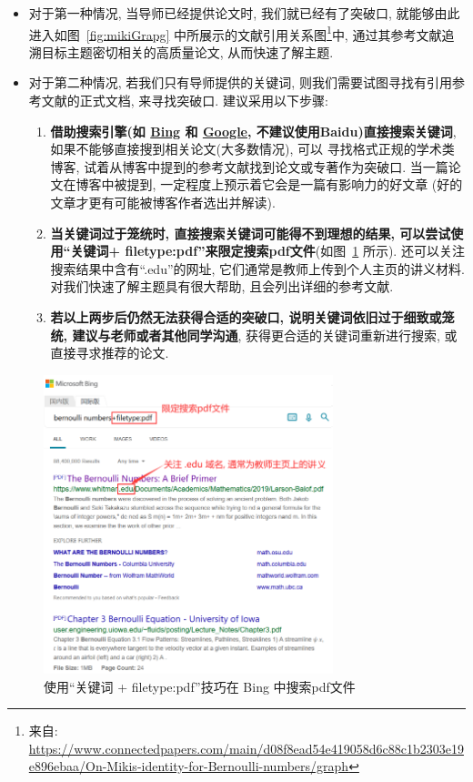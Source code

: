 \documentclass{formatBook}
\begin{document}
\begin{itemize}
    \item 对于第一种情况, 当导师已经提供论文时, 我们就已经有了突破口, 就能够由此进入如图~\ref{fig:mikiGrapg} 中所展示的文献引用关系图\footnote{来自: \url{https://www.connectedpapers.com/main/d08f8ead54e419058d6c88c1b2303e19e896ebaa/On-Mikis-identity-for-Bernoulli-numbers/graph}}中, 通过其参考文献追溯目标主题密切相关的高质量论文, 从而快速了解主题.
    \item 对于第二种情况, 若我们只有导师提供的关键词, 则我们需要试图寻找有引用参考文献的正式文档, 来寻找突破口. 建议采用以下步骤:
          \begin{enumerate}
              \item \textbf{借助搜索引擎(如 \href{https://www.bing.com/}{Bing} 和 \href{https://www.google.com/}{Google}, 不建议使用Baidu)直接搜索关键词}, 如果不能够直接搜到相关论文(大多数情况), 可以 寻找格式正规的学术类博客, 试着从博客中提到的参考文献找到论文或专著作为突破口. 当一篇论文在博客中被提到, 一定程度上预示着它会是一篇有影响力的好文章 (好的文章才更有可能被博客作者选出并解读).
              \item \textbf{当关键词过于笼统时, 直接搜索关键词可能得不到理想的结果, 可以尝试使用``关键词+ filetype:pdf''来限定搜索pdf文件}(如图~\ref{fig:bing} 所示). 还可以关注搜索结果中含有``.edu''的网址, 它们通常是教师上传到个人主页的讲义材料.  对我们快速了解主题具有很大帮助, 且会列出详细的参考文献.
              \item \textbf{若以上两步后仍然无法获得合适的突破口, 说明关键词依旧过于细致或笼统, 建议与老师或者其他同学沟通}, 获得更合适的关键词重新进行搜索, 或直接寻求推荐的论文.
          \end{enumerate}
\end{itemize}

\begin{figure}[H]
    \centering
    \includegraphics[width=0.75\textwidth]{figure/bingSearch.png}
    \caption{使用``关键词 + filetype:pdf''技巧在 Bing 中搜索pdf文件}
    \label{fig:bing}
\end{figure}
\end{document}
